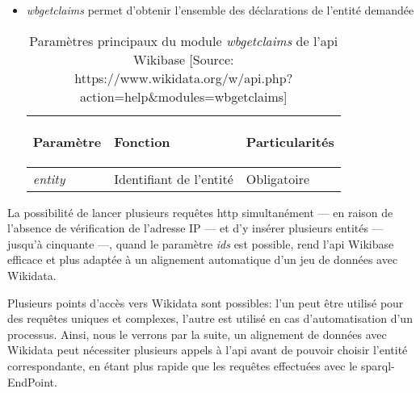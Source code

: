 \begin{itemize}
\begin{table}
		\label{wbgetentities}
	\end{table} 
	\item \textit{wbgetclaims} permet d'obtenir l'ensemble des déclarations de l'entité demandée
	\begin{table}
		\centering
		\begin{tabularx}{15cm}{|X|X|X|}
			\hline
			\begin{center}Paramètre\end{center}&\begin{center}Fonction\end{center}&\begin{center}Particularités\end{center}  \tabularnewline \hline
			\textit{entity}&Identifiant de l'entité&Obligatoire \tabularnewline \hline
		\end{tabularx}
		\caption[Paramètres principaux du module \textit{wbgetclaims} de l'\ac{api} Wikibase]{Paramètres principaux du module \textit{wbgetclaims} de l'\ac{api} Wikibase [Source: https://www.wikidata.org/w/api.php?action=help\&modules=wbgetclaims]}
		\label{wbgetclaims}
	\end{table} 
\end{itemize}
\medskip

La possibilité de lancer plusieurs requêtes \ac{http} simultanément --- en raison de l'absence de vérification de l'adresse IP --- et d'y insérer plusieurs entités --- jusqu'à cinquante ---, quand le paramètre \textit{ids} est possible, rend l'\ac{api} Wikibase efficace et plus adaptée à un alignement automatique d'un jeu de données avec Wikidata.

\bigskip
\bigskip
Plusieurs points d'accès vers Wikidata sont possibles: l'un peut être utilisé pour des requêtes uniques et complexes, l'autre est utilisé en cas d'automatisation d'un processus. Ainsi, nous le verrons par la suite, un alignement de données avec Wikidata peut nécessiter plusieurs appels à l'\ac{api} avant de pouvoir choisir l'entité correspondante, en étant plus rapide que les requêtes effectuées avec le \ac{sparql}-EndPoint. 